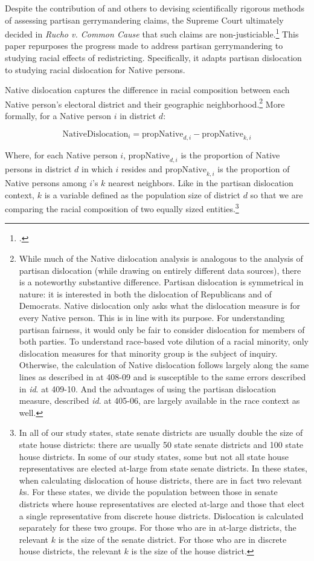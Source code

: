 \documentclass[12pt]{article}
\begin{document}
Despite the contribution of \cite{deford2022partisan} and others to devising scientifically rigorous methods of assessing partisan gerrymandering claims, the Supreme Court ultimately decided in \textit{Rucho v. Common Cause} that such claims are non-justiciable.\footnote{\cite{rucho2019}.} This paper repurposes the progress made to address partisan gerrymandering to studying racial effects of redistricting. Specifically, it adapts partisan dislocation to studying racial dislocation for Native persons.

Native dislocation captures the difference in racial composition between each Native person's electoral district and their geographic neighborhood.\footnote{While much of the Native dislocation analysis is analogous to the analysis of partisan dislocation (while drawing on entirely different data sources), there is a noteworthy substantive difference. Partisan dislocation is symmetrical in nature: it is interested in both the dislocation of Republicans and of Democrats. Native dislocation only asks what the dislocation measure is for every Native person. This is in line with its purpose. For understanding partisan fairness, it would only be fair to consider dislocation for members of both parties. To understand race-based vote dilution of a racial minority, only dislocation measures for that minority group is the subject of inquiry. Otherwise, the calculation of Native dislocation follows largely along the same lines as described in \cite{deford2022partisan} at 408-09 and is susceptible to the same errors described in \textit{id}. at 409-10. And the advantages of using the partisan dislocation measure, described \textit{id}. at 405-06, are largely available in the race context as well.} More formally, for a Native person $i$ in district $d$:

$$\text{NativeDislocation}_i = \text{propNative}_{d,i} - \text{propNative}_{k,i}$$

Where, for each Native person $i$, $\text{propNative}_{d,i}$ is the proportion of Native persons in district $d$ in which $i$ resides and $\text{propNative}_{k,i}$ is the proportion of Native persons among $i$'s $k$ nearest neighbors. Like in the partisan dislocation context, $k$ is a variable defined as the population size of district $d$ so that we are comparing the racial composition of two equally sized entities.\footnote{In all of our study states, state senate districts are usually double the size of state house districts: there are usually 50 state senate districts and 100 state house districts.  In some of our study states, some but not all state house representatives are elected at-large from state senate districts.  In these states, when calculating dislocation of house districts, there are in fact two relevant $k$s. For these states, we divide the population between those in senate districts where house representatives are elected at-large and those that elect a single representative from discrete house districts. Dislocation is calculated separately for these two groups. For those who are in at-large districts, the relevant $k$ is the size of the senate district. For those who are in discrete house districts, the relevant $k$ is the size of the house district.}
\end{document}
